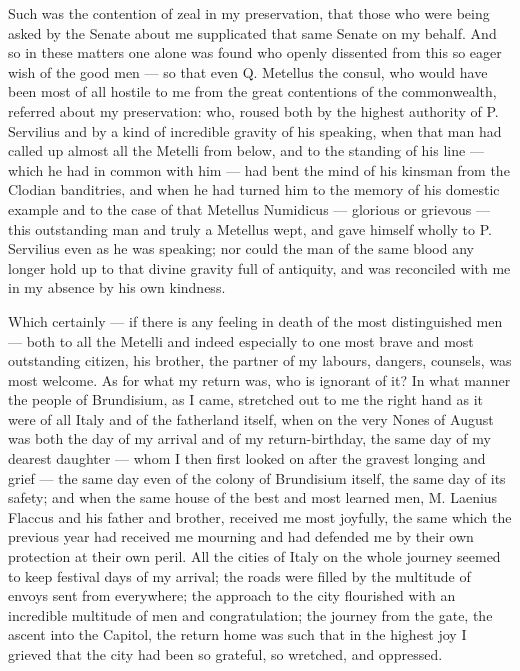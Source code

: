  Such was the contention of zeal in my preservation, that those who were being asked by the Senate about me supplicated that same Senate on my behalf. And so in these matters one alone was found who openly dissented from this so eager wish of the good men --- so that even Q. Metellus the consul, who would have been most of all hostile to me from the great contentions of the commonwealth, referred about my preservation: who, roused both by the highest authority of P. Servilius and by a kind of incredible gravity of his speaking, when that man had called up almost all the Metelli from below, and to the standing of his line --- which he had in common with him --- had bent the mind of his kinsman from the Clodian banditries, and when he had turned him to the memory of his domestic example and to the case of that Metellus Numidicus --- glorious or grievous --- this outstanding man and truly a Metellus wept, and gave himself wholly to P. Servilius even as he was speaking; nor could the man of the same blood any longer hold up to that divine gravity full of antiquity, and was reconciled with me in my absence by his own kindness.

 Which certainly --- if there is any feeling in death of the most distinguished men --- both to all the Metelli and indeed especially to one most brave and most outstanding citizen, his brother, the partner of my labours, dangers, counsels, was most welcome. As for what my return was, who is ignorant of it? In what manner the people of Brundisium, as I came, stretched out to me the right hand as it were of all Italy and of the fatherland itself, when on the very Nones of August was both the day of my arrival and of my return-birthday, the same day of my dearest daughter --- whom I then first looked on after the gravest longing and grief --- the same day even of the colony of Brundisium itself, the same day of its safety; and when the same house of the best and most learned men, M. Laenius Flaccus and his father and brother, received me most joyfully, the same which the previous year had received me mourning and had defended me by their own protection at their own peril. All the cities of Italy on the whole journey seemed to keep festival days of my arrival; the roads were filled by the multitude of envoys sent from everywhere; the approach to the city flourished with an incredible multitude of men and congratulation; the journey from the gate, the ascent into the Capitol, the return home was such that in the highest joy I grieved that the city had been so grateful, so wretched, and oppressed.

